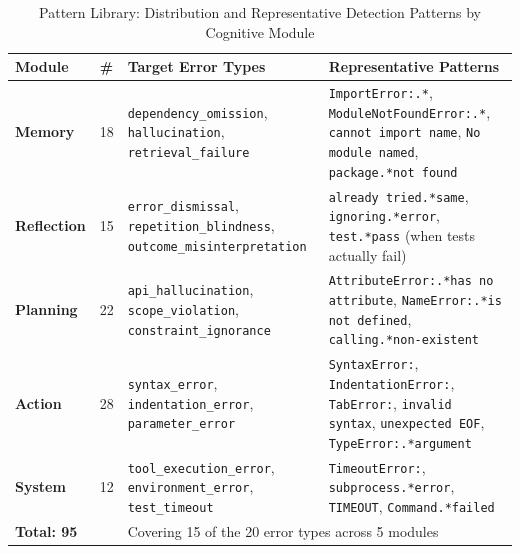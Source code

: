 \documentclass{ieeeaccess}
\begin{document}
\begin{table}[ht!]
\caption{Pattern Library: Distribution and Representative Detection Patterns by Cognitive Module}
\label{tab:patterns}
\centering
\setlength{\tabcolsep}{3pt}
\renewcommand{\arraystretch}{1.5}
\begin{tabularx}{\textwidth}{|p{}|p{}|p{}|X|}
\hline
\textbf{Module} & \textbf{\#} & \textbf{Target Error Types} & \textbf{Representative Patterns} \\
\hline

\textbf{Memory} & 18 &
\texttt{dependency\_\allowbreak{}omission}, \texttt{hallucination}, \texttt{retrieval\_\allowbreak{}failure} &
\texttt{ImportError:.*}, \texttt{Module\-Not\-Found\-Error:.*}, \texttt{cannot import name}, \texttt{No module named}, \texttt{package.*not found} \\
\hline

\textbf{Reflection} & 15 &
\texttt{error\_\allowbreak{}dismissal}, \texttt{repetition\_\allowbreak{}blindness}, \texttt{outcome\_\allowbreak{}misinterpretation} &
\texttt{already tried.*same}, \texttt{ignoring.*error}, \texttt{test.*pass} (when tests actually fail) \\
\hline

\textbf{Planning} & 22 &
\texttt{api\_\allowbreak{}hallucination}, \texttt{scope\_\allowbreak{}violation}, \texttt{constraint\_\allowbreak{}ignorance} &
\texttt{Attribute\-Error:.*has no attribute}, \texttt{Name\-Error:.*is not defined}, \texttt{calling.*non-existent} \\
\hline

\textbf{Action} & 28 &
\texttt{syntax\_\allowbreak{}error}, \texttt{indentation\_\allowbreak{}error}, \texttt{parameter\_\allowbreak{}error} &
\texttt{SyntaxError:}, \texttt{Indentation\-Error:}, \texttt{TabError:}, \texttt{invalid syntax}, \texttt{unexpected EOF}, \texttt{TypeError:.*argument} \\
\hline

\textbf{System} & 12 &
\texttt{tool\_\allowbreak{}execution\_\allowbreak{}error}, \texttt{environment\_\allowbreak{}error}, \texttt{test\_\allowbreak{}timeout} &
\texttt{Timeout\-Error:}, \texttt{subprocess.*error}, \texttt{TIMEOUT}, \texttt{Command.*failed} \\
\hline

\multicolumn{2}{|l|}{\textbf{Total: 95}} & \multicolumn{2}{l|}{Covering 15 of the 20 error types across 5 modules} \\
\hline
\end{tabularx}
\end{table}
\end{document}
